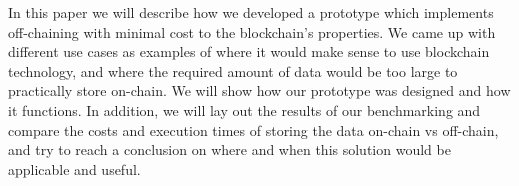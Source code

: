 In this paper we will describe how we developed a prototype which implements off-chaining with minimal cost to the blockchain’s properties. We came up with different use cases as examples of where it would make sense to use blockchain technology, and where the required amount of data would be too large to practically store on-chain. We will show how our prototype was designed and how it functions. In addition, we will lay out the results of our benchmarking and compare the costs and execution times of storing the data on-chain vs off-chain, and try to reach a conclusion on where and when this solution would be applicable and useful.

\newpage
